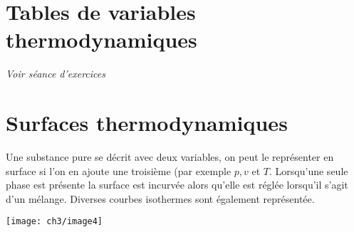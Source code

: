 \section{Tables de variables thermodynamiques}
\textit{Voir séance d'exercices}


\section{Surfaces thermodynamiques}
Une substance pure se décrit avec deux variables, on peut le 
représenter en surface si l'on en ajoute une troisième (par 
exemple $p,v$ et $T$. Lorsqu'une seule phase est présente la 
surface est incurvée alors qu'elle est réglée lorsqu'il s'agit 
d'un mélange. Diverses courbes isothermes sont également 
représentée.

\begin{center}
\texttt{[image: ch3/image4]}
\end{center}








 



